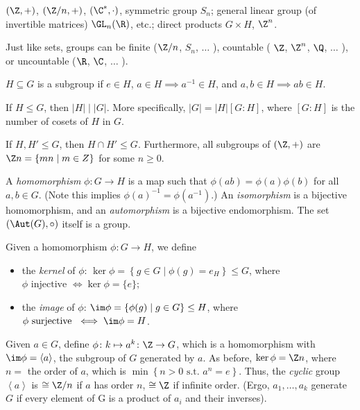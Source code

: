 \documentclass{notes}
\begin{document}
\begin{example}
    $(\Z ,+)$, $(\Z /n,+)$, $(\C ^{*}, \cdot )$, symmetric group $S_n$; general linear group (of invertible matrices) $\GL_n(\R )$, etc.; direct products $G\times H$, $\Z ^n$.

    Just like sets, groups can be finite ($\Z /n$, $S_n$, $\ldots $ ), countable ( $\Z $, $\Z ^{n}$, $\Q $, $\ldots $ ), or uncountable ($\R$, $\C $, $\ldots $ ).
\end{example}

\begin{defn}
    $H\subseteq G$ is a subgroup if $e\in H$, $a\in H\implies a^{-1}\in H$, and $a,b\in H\implies ab\in H$.
\end{defn}

\begin{theorem}[Lagrange]
    If $H\le G$, then $|H| \mid  |G|$. More specifically, $|G|=|H| [G\colon H]$, where $[G\colon H]$ is the number of cosets of $H$ in $G$.
\end{theorem}

\begin{example}
    If $H,H'\le G$, then $H\cap H'\le G$. Furthermore, all subgroups of $(\Z ,+)$ are $\Z n=\left\{ mn\mid  m\in Z \right\} $ for some $n\ge 0$. 
\end{example}

\begin{defn}
    A \emph{homomorphism} $\phi \colon G \to H $ is a map such that $\phi (ab)=\phi (a)\phi (b)$ for all $a,b\in G$. (Note this implies $\phi (a)^{-1}= \phi (a^{-1})$.) An \emph{isomorphism} is a bijective homomorphism, and an \emph{automorphism} is a bijective endomorphism. The set $(\Aut (G), \circ)$ itself is a group.
\end{defn}

\begin{defn}
    Given a homomorphism $\phi \colon G \to H $, we define
    \begin{itemize}
        \item the \emph{kernel} of $\phi $: $\ker \phi =\left\{ g\in G\mid  \phi (g)=e_H \right\} \le G$, where $\phi \text{ injective }\iff \ker \phi =\{e\}$;
        \item the \emph{image} of $\phi $: $\im \phi =\{\phi (g)\mid  g\in G\}\le H$, where $\phi \text{ surjective } \iff \im \phi =H$.
    \end{itemize}
\end{defn}

\begin{defn}
    Given $a\in G$, define $\phi\colon k\mapsto a^k\colon \Z \to G$, which is a homomorphism with $\im \phi =\left\langle a \right\rangle$, the subgroup of $G$ generated by $a$. As before, $\ker \phi =\Z n$, where $n=$ the order of $a$, which is $\min \left\{ n>0 \text{ s.t. } a^n=e \right\} $.
    Thus, the  \emph{cyclic} group $\left\langle a \right\rangle$ is $\cong \Z /n$ if $a$ has order $n$, $\cong \Z $ if infinite order. (Ergo, ${a}_{1},\ldots,{a}_{k} $ generate $G$  if every element of G is a product of $a_i$ and their inverses).
\end{defn}
\end{document}
